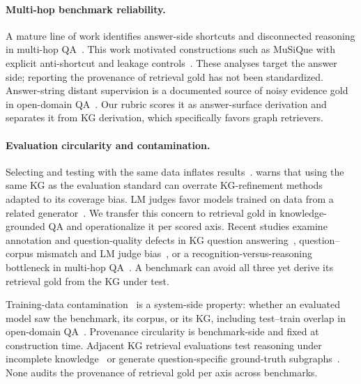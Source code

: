 \documentclass[11pt]{article}
\begin{document}
\paragraph{Multi-hop benchmark reliability.} A mature line of work identifies answer-side shortcuts and disconnected reasoning in multi-hop QA~\citep{min2019compositional,trivedi2020dire}. This work motivated constructions such as MuSiQue with explicit anti-shortcut and leakage controls~\citep{trivedi2022musique}. These analyses target the answer side; reporting the provenance of retrieval gold has not been standardized. Answer-string distant supervision is a documented source of noisy evidence gold in open-domain QA~\citep{chen2017drqa,lin2018denoising}. Our rubric scores it as answer-surface derivation and separates it from KG derivation, which specifically favors graph retrievers.

\paragraph{Evaluation circularity and contamination.} Selecting and testing with the same data inflates results~\citep{kriegeskorte2009circular,kapoor2023leakage}. \citet{paulheim2017refinement} warns that using the same KG as the evaluation standard can overrate KG-refinement methods adapted to its coverage bias. LM judges favor models trained on data from a related generator~\citep{li2026preferenceleakage}. We transfer this concern to retrieval gold in knowledge-grounded QA and operationalize it per scored axis. Recent studies examine annotation and question-quality defects in KG question answering~\citep{zhang2025kgqapitfalls}, question--corpus mismatch and LM judge bias~\citep{judgebias2025}, or a recognition-versus-reasoning bottleneck in multi-hop QA~\citep{weakestlink2026}. A benchmark can avoid all three yet derive its retrieval gold from the KG under test.

Training-data contamination~\citep{sainz2023contamination,golchin2024timetravel,deng2024contamination} is a system-side property: whether an evaluated model saw the benchmark, its corpus, or its KG, including test--train overlap in open-domain QA~\citep{lewis2021qaoverlap}. Provenance circularity is benchmark-side and fixed at construction time. Adjacent KG retrieval evaluations test reasoning under incomplete knowledge~\citep{zhou2025brink} or generate question-specific ground-truth subgraphs~\citep{cattaneo2026gtsubgraphs}. None audits the provenance of retrieval gold per axis across benchmarks.
\end{document}
